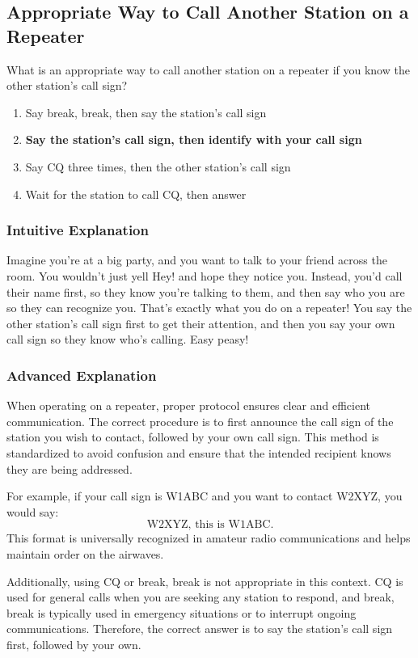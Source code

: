 \subsection{Appropriate Way to Call Another Station on a Repeater}\label{T2A04}

\begin{tcolorbox}[colback=gray!10!white,colframe=black!75!black,title=T2A04]
What is an appropriate way to call another station on a repeater if you know the other station's call sign?
\begin{enumerate}[label=\Alph*]
    \item Say break, break, then say the station's call sign
    \item \textbf{Say the station's call sign, then identify with your call sign}
    \item Say CQ three times, then the other station's call sign
    \item Wait for the station to call CQ, then answer
\end{enumerate}
\end{tcolorbox}

\subsubsection{Intuitive Explanation}
Imagine you're at a big party, and you want to talk to your friend across the room. You wouldn't just yell Hey! and hope they notice you. Instead, you'd call their name first, so they know you're talking to them, and then say who you are so they can recognize you. That's exactly what you do on a repeater! You say the other station's call sign first to get their attention, and then you say your own call sign so they know who's calling. Easy peasy!

\subsubsection{Advanced Explanation}
When operating on a repeater, proper protocol ensures clear and efficient communication. The correct procedure is to first announce the call sign of the station you wish to contact, followed by your own call sign. This method is standardized to avoid confusion and ensure that the intended recipient knows they are being addressed. 

For example, if your call sign is W1ABC and you want to contact W2XYZ, you would say: 
\[
\text{W2XYZ, this is W1ABC.}
\]
This format is universally recognized in amateur radio communications and helps maintain order on the airwaves. 

Additionally, using CQ or break, break is not appropriate in this context. CQ is used for general calls when you are seeking any station to respond, and break, break is typically used in emergency situations or to interrupt ongoing communications. Therefore, the correct answer is to say the station's call sign first, followed by your own.

